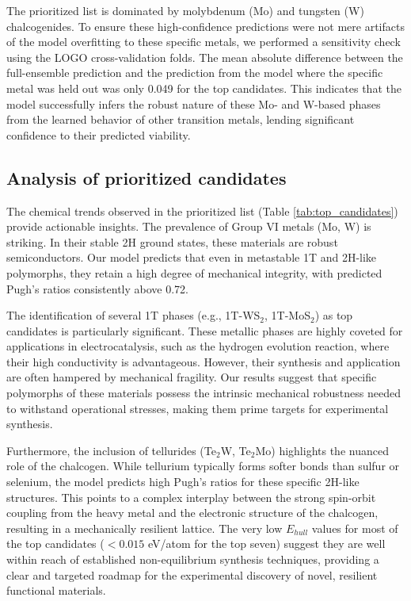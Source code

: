 \documentclass[]{article}
\begin{document}
The prioritized list is dominated by molybdenum (Mo) and tungsten (W) chalcogenides. To ensure these high-confidence predictions were not mere artifacts of the model overfitting to these specific metals, we performed a sensitivity check using the LOGO cross-validation folds. The mean absolute difference between the full-ensemble prediction and the prediction from the model where the specific metal was held out was only 0.049 for the top candidates. This indicates that the model successfully infers the robust nature of these Mo- and W-based phases from the learned behavior of other transition metals, lending significant confidence to their predicted viability.

\subsection{Analysis of prioritized candidates}

The chemical trends observed in the prioritized list (Table \ref{tab:top_candidates}) provide actionable insights. The prevalence of Group VI metals (Mo, W) is striking. In their stable 2H ground states, these materials are robust semiconductors. Our model predicts that even in metastable 1T and 2H-like polymorphs, they retain a high degree of mechanical integrity, with predicted Pugh's ratios consistently above 0.72.

The identification of several 1T phases (e.g., 1T-WS$_2$, 1T-MoS$_2$) as top candidates is particularly significant. These metallic phases are highly coveted for applications in electrocatalysis, such as the hydrogen evolution reaction, where their high conductivity is advantageous. However, their synthesis and application are often hampered by mechanical fragility. Our results suggest that specific polymorphs of these materials possess the intrinsic mechanical robustness needed to withstand operational stresses, making them prime targets for experimental synthesis.

Furthermore, the inclusion of tellurides (Te$_2$W, Te$_2$Mo) highlights the nuanced role of the chalcogen. While tellurium typically forms softer bonds than sulfur or selenium, the model predicts high Pugh's ratios for these specific 2H-like structures. This points to a complex interplay between the strong spin-orbit coupling from the heavy metal and the electronic structure of the chalcogen, resulting in a mechanically resilient lattice. The very low $E_{hull}$ values for most of the top candidates ($<0.015$ eV/atom for the top seven) suggest they are well within reach of established non-equilibrium synthesis techniques, providing a clear and targeted roadmap for the experimental discovery of novel, resilient functional materials.
\end{document}
